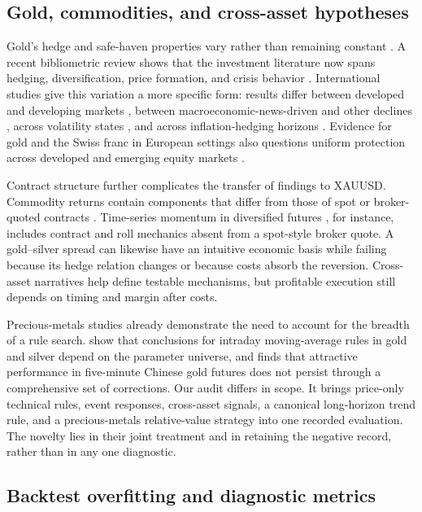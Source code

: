 \subsection{Gold, commodities, and cross-asset hypotheses}

Gold's hedge and safe-haven properties vary rather than remaining constant \citep{baur2010hedge,baur2010safe}. A recent bibliometric review shows that the investment literature now spans hedging, diversification, price formation, and crisis behavior \citep{pattnaik2023}. International studies give this variation a more specific form: results differ between developed and developing markets \citep{gurdgiev2024}, between macroeconomic-news-driven and other declines \citep{ryan2024}, across volatility states \citep{faraj2025}, and across inflation-hedging horizons \citep{xu2026}. Evidence for gold and the Swiss franc in European settings also questions uniform protection across developed and emerging equity markets \citep{papathanasiou2026}.

Contract structure further complicates the transfer of findings to XAUUSD. Commodity returns contain components that differ from those of spot or broker-quoted contracts \citep{erb2006}. Time-series momentum in diversified futures \citep{moskowitz2012,szakmary2010,hurst2017}, for instance, includes contract and roll mechanics absent from a spot-style broker quote. A gold--silver spread can likewise have an intuitive economic basis while failing because its hedge relation changes or because costs absorb the reversion. Cross-asset narratives help define testable mechanisms, but profitable execution still depends on timing and margin after costs.

Precious-metals studies already demonstrate the need to account for the breadth of a rule search. \citet{batten2018} show that conclusions for intraday moving-average rules in gold and silver depend on the parameter universe, and \citet{jin2022} finds that attractive performance in five-minute Chinese gold futures does not persist through a comprehensive set of corrections. Our audit differs in scope. It brings price-only technical rules, event responses, cross-asset signals, a canonical long-horizon trend rule, and a precious-metals relative-value strategy into one recorded evaluation. The novelty lies in their joint treatment and in retaining the negative record, rather than in any one diagnostic.

\subsection{Backtest overfitting and diagnostic metrics}

